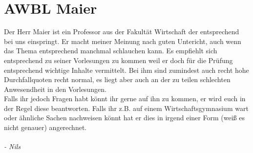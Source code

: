 \chapter{AWBL Maier}

Der Herr Maier ist ein Professor aus der Fakultät Wirtschaft der entsprechend bei uns einspringt. Er macht meiner Meinung nach guten Untericht, auch wenn das Thema entsprechend manchmal schlauchen kann. Es empfiehlt sich entsprechend zu seiner Vorlesungen zu kommen weil er doch für die Prüfung entsprechend wichtige Inhalte vermittelt. Bei ihm sind zumindest auch recht hohe Durchfallquoten recht normal, es liegt aber auch an der zu teilen schlechten Anwesendheit in den Vorlesungen.\\
Falls ihr jedoch Fragen habt könnt ihr gerne auf ihn zu kommen, er wird euch in der Regel diese beantworten. Falls ihr z.B. auf einem Wirtschaftsgymnasium wart oder ähnliche Sachen nachweisen könnt hat er dies in irgend einer Form (weiß es nicht genauer) angerechnet.
\\~\\
\emph{- Nils}




